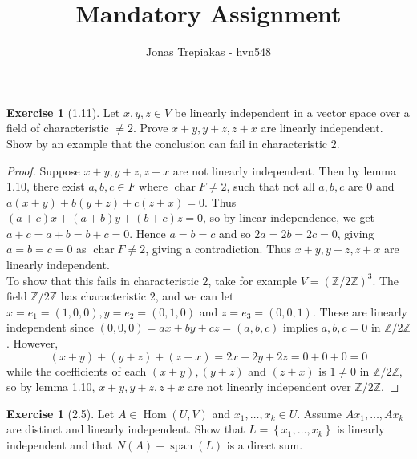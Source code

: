 \documentclass[reqno]{amsart}
\title{Mandatory Assignment}
\author{Jonas Trepiakas - hvn548}
\theoremstyle{definition}
\newtheorem{exercise}[theorem]{Exercise}
\theoremstyle{remark}
\DeclareMathOperator{\Span}{span}
\DeclareMathOperator{\Hom}{Hom}
\DeclareMathOperator{\Char}{char}
\begin{document}
\maketitle


\begin{exercise}[1.11]
    Let $x,y,z \in V$ be linearly independent in a 
    vector space over a field of characteristic
    $\neq 2$. Prove $x+y, y+z, z+x$ are linearly independent.
    Show by an example that the conclusion can fail
    in characteristic $2$.
\end{exercise}

\begin{proof}
    Suppose $x+y, y+z, z+x$ are not linearly independent. Then
    by lemma 1.10, there exist
    $a,b,c \in F$ where $\Char F \neq 2$, such that
    not all $a,b,c$ are $0$ and
    $a\left( x+y \right) + b(y+z) + c(z+x) = 0$. Thus
    $(a+c) x + (a+b) y + (b+c) z = 0$, so by linear independence,
    we get $a+c = a+b = b+c = 0$. Hence
    $a = b = c$ and so $2a = 2b = 2c = 0$, giving
    $a = b = c = 0$ as $\Char F \neq 2$, giving a contradiction.
    Thus $x+y, y+z, z+x$ are linearly independent.\\
    \linebreak
    To show that this fails in characteristic $2$,
    take for example $V = \left( \mathbb{Z}/2\mathbb{Z} \right)^3$.
    The field $\mathbb{Z} /2\mathbb{Z}$ has characteristic $2$, and
    we can let $x = e_1 = (1,0,0), y = e_2 = (0,1,0)$ and
    $z = e_3 = (0,0,1)$. These are linearly independent since
    $(0,0,0) =ax+by+cz = \left( a,b,c \right) $ implies
    $a,b,c = 0$ in  $\mathbb{Z}/2\mathbb{Z}$.
    However,
    \[
        (x+y) + (y+z) + (z+x) = 
        2x + 2y + 2z = 0 + 0 + 0 = 0
    \] 
    while the coefficients of each
    $(x+y), (y+z)$ and $(z+x)$ is $1 \neq 0$ in
    $\mathbb{Z} / 2\mathbb{Z}$, so by lemma 1.10,
    $x+y, y+z, z+x$ are not linearly independent over
    $\mathbb{Z} / 2\mathbb{Z}$.
\end{proof}



\begin{exercise}[2.5]
    Let $A \in \Hom (U,V)$ and
    $x_1 ,\ldots, x_k \in U$. Assume $Ax_1, \ldots, Ax_k$ are
    distinct and linearly independent. Show that
    $L = \left\{ x_1, \ldots, x_k \right\} $ is linearly
    independent and that
    $N (A) + \Span (L)$ is a direct sum.
\end{exercise}
\end{document}
